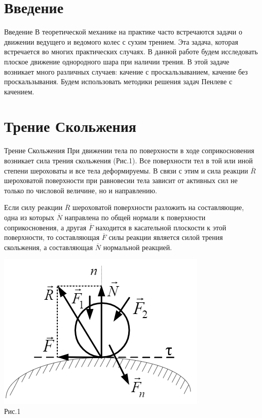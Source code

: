\documentclass[a4paper]{article}
\begin{document}
 
\newpage
     
\tableofcontents %
\newpage
 
\newpage
\section{Введение}{Введение} 
       В теоретической механике на практике часто встречаются задачи о движении ведущего и ведомого колес с сухим трением. Эта задача, которая встречается во многих практических случаях. 
       В данной работе будем исследовать плоское движение однородного шара при наличии трения. В этой задаче возникает много различных случаев: качение с проскальзыванием, качение без проскальзывания. Будем использовать методики решения задач Пенлеве с качением.


\newpage
\section{Трение Скольжения}{Трение Скольжения}  
При движении тела по поверхности в ходе соприкосновения возникает сила трения скольжения (Рис.1).
Все поверхности тел в той или иной степени шероховаты и все тела деформируемы. В связи с этим и сила реакции $\overline{R}$ шероховатой поверхности при равновесии тела зависит от активных сил не только по числовой величине, но и направлению. 

Если силу реакции $\overline{R}$ шероховатой поверхности разложить на составляющие, одна из которых $\overline{N}$ направлена по общей нормали к поверхности соприкосновения, а другая $\overline{F}$ находится в касательной плоскости к этой поверхности, то составляющая $\overline{F}$ силы реакции является силой трения скольжения, а составляющая $\overline{N}$ нормальной реакцией.

\begin{center}
\includegraphics[scale=0.8]{1.png}\\
{\small Рис.1}
\end{center}
\end{document}
